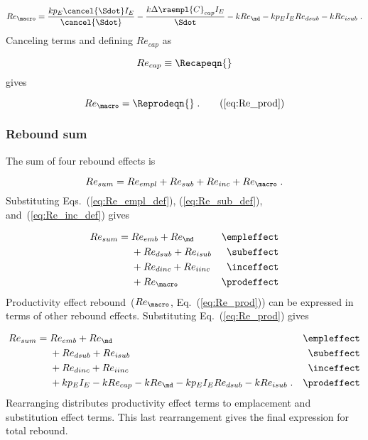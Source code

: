 \begin{equation}
  Re_{\macro} = \frac{k p_E \cancel{\Sdot} I_E}{\cancel{\Sdot}}
                                - \frac{k \Delta \raempl{C}_{cap} I_E}{\Sdot}
                                - k Re_{\md}
                                - k p_E I_E Re_{dsub}
                                - k Re_{isub} \; .
\end{equation}
%
Canceling terms and defining $Re_{cap}$ as

\begin{equation} \label{eq:Re_cap}
  Re_{cap} \equiv \Recapeqn{}
\end{equation}
%
gives

\begin{equation}
  Re_{\macro} = \Reprodeqn{} \; . \tag{\ref{eq:Re_prod}}
\end{equation}


\subsubsection{Rebound sum} 
\label{sec:total_rebound}

The sum of four rebound effects is 

\begin{equation}
  Re_{sum} = Re_{empl} + Re_{sub} + Re_{inc} + Re_{\macro} \; .
\end{equation}
%
Substituting Eqs.~(\ref{eq:Re_empl_def}), (\ref{eq:Re_sub_def}), and~(\ref{eq:Re_inc_def}) gives

\begin{align}
  Re_{sum} = \; &Re_{emb} + Re_{\md}      & \mathrm{\empleffect} \nonumber \\
                &+ Re_{dsub} + Re_{isub}   & \mathrm{\subeffect}  \nonumber \\
                &+ Re_{dinc} + Re_{iinc}   & \mathrm{\inceffect}  \nonumber \\
                &+ Re_{\macro}      & \mathrm{\prodeffect}
\end{align}
%
Productivity effect rebound~($Re_{\macro}$, Eq.~(\ref{eq:Re_prod}))
can be expressed in terms of other rebound effects.
Substituting Eq.~(\ref{eq:Re_prod}) gives

\begin{align}
  Re_{sum} = \; &Re_{emb} + Re_{\md}      & \mathrm{\empleffect}       \nonumber \\
                &+ Re_{dsub} + Re_{isub}   & \mathrm{\subeffect}        \nonumber \\
                &+ Re_{dinc} + Re_{iinc}   & \mathrm{\inceffect}        \nonumber \\
                &+ k p_E I_E - k Re_{cap} - k Re_{\md} - k p_E I_E Re_{dsub} - k Re_{isub} \; .  & \mathrm{\prodeffect}
\end{align}
%
Rearranging distributes productivity effect terms 
to emplacement and substitution effect terms.
This last rearrangement gives the final expression for total rebound.

